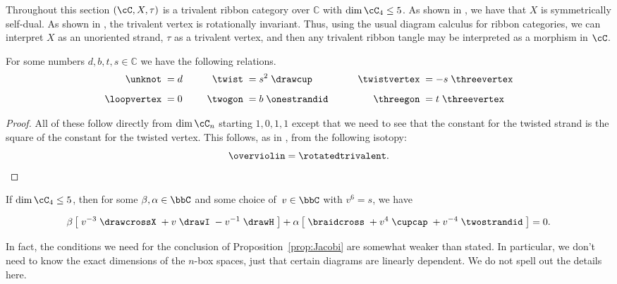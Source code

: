 \documentclass[12pt]{amsart}
\begin{document}
Throughout this section $(\cC, X, \tau)$ is a trivalent ribbon category over
$\mathbb{C}$ with $\dim{\cC_4} \leq 5$.  As shown in \cite[Lemma
2.2]{MR3624901}, we have that $X$ is symmetrically self-dual.  As shown in
\cite[Lemma 8.2]{MR3624901}, the trivalent vertex is rotationally invariant.
Thus, using the usual diagram calculus for ribbon categories, we can interpret
$X$ as an unoriented strand, $\tau$ as a trivalent vertex, and then any
trivalent ribbon tangle may be interpreted as a morphism in $\cC$.

\begin{lemma} \label{lem:constants}
  For some numbers $d, b, t, s \in \mathbb{C}$ we have the following relations.
  \begin{equation}
    \label{eq:simple-rels}
  \begin{aligned}
    \unknot\; &= d&\qquad
      \twist\; &= s^2\;\drawcup&\qquad
        \twistvertex\; &= -s\;\threevertex\\[5pt]
    \loopvertex\;&=0&
      \twogon\;&= b\;\onestrandid&
        \threegon\; &= t\;\threevertex
  \end{aligned}
  \end{equation}
\end{lemma}

\begin{proof}
All of these follow directly from $\dim \cC_n$ starting $1,0,1,1$ except that
we need to see that the constant for the twisted strand is the square of the
constant for the twisted vertex.  This follows, as in
\cite[Lemma~8.2]{MR3624901}, from the following isotopy:
\begin{equation*}
\overviolin = \rotatedtrivalent. \qedhere
\end{equation*}
\end{proof}

\begin{proposition}\label{prop:Jacobi}
If $\dim \cC_4 \leq 5$, then for some $\beta, \alpha \in \bbC$ and some choice
of~$v \in \bbC$ with $v^6 = s$, we have

\begin{equation}
\beta \left[\; v^{-3} \;
\drawcrossX
\;+ v \;
\drawI
\; -v^{-1} \;
 \drawH
\;\right]
 + \alpha
\left[\; \braidcross \;
 + v^{4}\;
\cupcap
\; + v^{-4} \;
 \twostrandid \;
 \right] = 0.\label{eq:quant-except-init}
 \end{equation}
\end{proposition}

In fact, the conditions we need for the conclusion of
Proposition~\ref{prop:Jacobi} are somewhat weaker than stated. In particular,
we don't need to know the exact dimensions of the $n$-box spaces, just that
certain diagrams are linearly dependent. We do not spell out the details here.
\end{document}
